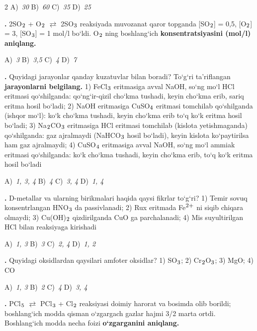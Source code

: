 \documentclass[11pt,a4paper]{article}
\renewcommand{\textsubscript}[1]{\ensuremath{_{\text{\fontsize{8}{8}\selectfont #1}}}}
\renewcommand{\textsuperscript}[1]{\ensuremath{^{\text{\fontsize{8}{8}\selectfont #1}}}}
\newcommand{\qn}[1]{\textbf{\fontsize{11.5}{13}\selectfont #1}}
\newcommand{\qsep}{\par\vspace{13pt}}
\begin{document}
\begin{multicols}{2}
\noindent A)~\textsl{30} \hfill B)~\textsl{60} \hfill C)~\textsl{35} \hfill D)~\textsl{25}\par
\qsep
\noindent\qn{13.} 2SO\textsubscript{2} + O\textsubscript{2} $\rightleftarrows$ 2SO\textsubscript{3} reaksiyada muvozanat qaror topganda [SO\textsubscript{2}] = 0,5, [O\textsubscript{2}] = 3, [SO\textsubscript{3}] = 1 mol/l bo`ldi. O\textsubscript{2} ning boshlang`ich \textbf{konsentratsiyasini (mol/l) aniqlang.}

\noindent A)~\textsl{3} \hfill B)~\textsl{3,5} \hfill C)~\textsl{4} \hfill D)~\textsl{7}\par
\qsep
\noindent\qn{14.} Quyidagi jarayonlar qanday kuzatuvlar bilan boradi? To`g`ri ta'riflangan \textbf{jarayonlarni belgilang.} 1) FeCl\textsubscript{3} eritmasiga avval NaOH, so`ng mo`l HCl eritmasi qo`shilganda: qo`ng`ir-qizil cho`kma tushadi, keyin cho`kma erib, sariq eritma hosil bo`ladi; 2) NaOH eritmasiga CuSO\textsubscript{4} eritmasi tomchilab qo`shilganda (ishqor mo`l): ko`k cho`kma tushadi, keyin cho`kma erib to`q ko`k eritma hosil bo`ladi; 3) Na\textsubscript{2}CO\textsubscript{3} eritmasiga HCl eritmasi tomchilab (kislota yetishmaganda) qo`shilganda: gaz ajralmaydi (NaHCO\textsubscript{3} hosil bo`ladi), keyin kislota ko`paytirilsa ham gaz ajralmaydi; 4) CuSO\textsubscript{4} eritmasiga avval NaOH, so`ng mo`l ammiak eritmasi qo`shilganda: ko`k cho`kma tushadi, keyin cho`kma erib, to`q ko`k eritma hosil bo`ladi

\noindent A)~\textsl{1, 3, 4} \hfill B)~\textsl{4} \hfill C)~\textsl{3, 4} \hfill D)~\textsl{1, 4}\par
\qsep
\noindent\qn{15.} D-metallar va ularning birikmalari haqida qaysi fikrlar to`g`ri? 1) Temir sovuq konsentrlangan HNO\textsubscript{3} da passivlanadi; 2) Rux eritmada Fe\textsuperscript{2+} ni siqib chiqara olmaydi; 3) Cu(OH)\textsubscript{2} qizdirilganda CuO ga parchalanadi; 4) Mis suyultirilgan HCl bilan reaksiyaga kirishadi

\noindent A)~\textsl{1, 3} \hfill B)~\textsl{3} \hfill C)~\textsl{2, 4} \hfill D)~\textsl{1, 2}\par
\qsep
\noindent\qn{16.} Quyidagi oksidlardan qaysilari amfoter oksidlar? 1) SO\textsubscript{3}; 2) Cr\textsubscript{2}O\textsubscript{3}; 3) MgO; 4) CO

\noindent A)~\textsl{1, 3} \hfill B)~\textsl{2} \hfill C)~\textsl{4} \hfill D)~\textsl{3, 4}\par
\qsep
\noindent\qn{17.} PCl\textsubscript{5} $\rightleftarrows$ PCl\textsubscript{3} + Cl\textsubscript{2} reaksiyasi doimiy harorat va bosimda olib borildi; boshlang`ich modda qisman o`zgargach gazlar hajmi 3/2 marta ortdi. Boshlang`ich modda necha foizi \textbf{o`zgarganini aniqlang.}


\end{multicols}
\end{document}
